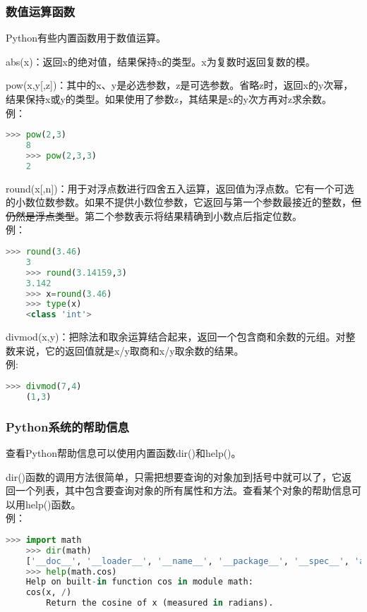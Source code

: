 \documentclass[11pt,a4paper]{article}
\begin{document}
\subsubsection{数值运算函数}

Python有些内置函数用于数值运算。

abs(x)：返回x的绝对值，结果保持x的类型。x为复数时返回复数的模。

pow(x,y[,z])：其中的x、y是必选参数，z是可选参数。省略z时，返回x的y次幂，结果保持x或y的类型。如果使用了参数z，其结果是x的y次方再对z求余数。\\
例：
\begin{lstlisting}[language={Python}]
    >>> pow(2,3)
    8
    >>> pow(2,3,3)
    2
\end{lstlisting}

round(x[,n])：用于对浮点数进行四舍五入运算，返回值为浮点数。它有一个可选的小数位数参数。如果不提供小数位参数，它返回与第一个参数最接近的整数，\sout{但仍然是浮点类型}。第二个参数表示将结果精确到小数点后指定位数。\\
例：

\begin{lstlisting}[language={Python}]
    >>> round(3.46)
    3
    >>> round(3.14159,3)
    3.142
    >>> x=round(3.46)
    >>> type(x)
    <class 'int'>
\end{lstlisting}

divmod(x,y)：把除法和取余运算结合起来，返回一个包含商和余数的元组。对整数来说，它的返回值就是x/y取商和x/y取余数的结果。\\
例:
\begin{lstlisting}[language={Python}]
    >>> divmod(7,4)
    (1,3)
\end{lstlisting}

\subsubsection{Python系统的帮助信息}

查看Python帮助信息可以使用内置函数dir()和help()。

dir()函数的调用方法很简单，只需把想要查询的对象加到括号中就可以了，它返回一个列表，其中包含要查询对象的所有属性和方法。查看某个对象的帮助信息可以用help()函数。\\
例：
\begin{lstlisting}[language={Python}]
    >>> import math
    >>> dir(math)
    ['__doc__', '__loader__', '__name__', '__package__', '__spec__', 'acos', 'acosh', 'asin', 'asinh', 'atan', 'atan2', 'atanh', 'ceil', 'comb', 'copysign', 'cos', 'cosh', 'degrees', 'dist', 'e', 'erf', 'erfc', 'exp', 'expm1', 'fabs', 'factorial', 'floor', 'fmod', 'frexp', 'fsum', 'gamma', 'gcd', 'hypot', 'inf', 'isclose', 'isfinite', 'isinf', 'isnan', 'isqrt', 'lcm', 'ldexp', 'lgamma', 'log', 'log10', 'log1p', 'log2', 'modf', 'nan', 'nextafter', 'perm', 'pi', 'pow', 'prod', 'radians', 'remainder', 'sin', 'sinh', 'sqrt', 'tan', 'tanh', 'tau', 'trunc', 'ulp']
    >>> help(math.cos)
    Help on built-in function cos in module math:
    cos(x, /)
        Return the cosine of x (measured in radians).
\end{lstlisting}
\end{document}
